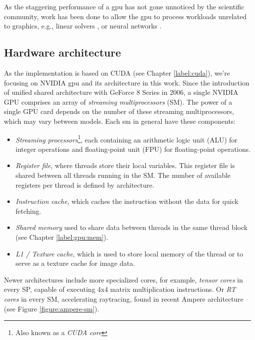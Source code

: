 As the staggering performance of a \acrshort{gpu} has not gone unnoticed by the scientific community, work has been done to allow the \acrshort{gpu} to process workloads unrelated to graphics, e.g., linear solvers \cite{cusolver}, or neural networks \cite{cudnn}.

\subsection{Hardware architecture}

As the implementation is based on CUDA (see Chapter \ref{label:cuda}), we're focusing on NVIDIA \acrshort{gpu} and its architecture in this work. Since the introduction of unified shared architecture with GeForce 8 Series in 2006, a single NVIDIA GPU comprises an array of \textit{streaming multiprocessors} (SM). The power of a single GPU card depends on the number of these streaming multiprocessors, which may vary between models. Each \acrshort{sm} in general have these components:
\begin{itemize}
  \item \textit{Streaming processors}\footnote{Also known as a \textit{CUDA core}}, each containing an arithmetic logic unit (ALU) for integer operations and floating-point unit (FPU) for floating-point operations.
  \item \textit{Register file}, where threads store their local variables. This register file is shared between all threads running in the SM. The number of available registers per thread is defined by architecture.
  \item \textit{Instruction cache}, which caches the instruction without the data for quick fetching.
  \item \textit{Shared memory} used to share data between threads in the same thread block (see Chapter \ref{label:gpu:mem}).
  \item \textit{L1 / Texture cache}, which is used to store local memory of the thread or to serve as a texture cache for image data.
\end{itemize}

Newer architectures include more specialized cores, for example, \textit{tensor cores} in every SP, capable of executing 4x4 matrix multiplication instructions. Or \textit{RT cores} in every SM, accelerating raytracing, found in recent Ampere architecture (see Figure \ref{figure:ampere-sm}).

